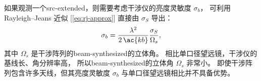 如果观测一个\ac{src-extended}，则需要考虑干涉仪的亮度灵敏度 $\sigma_b$，
可利用 Rayleigh--Jeans 近似 [\autoref{eq:rj-approx}]
直接由 $\sigma_S$ 导出：
\begin{equation}
  \label{eq:sigma-tb}
  \sigma_b = \frac{\lambda^2}{2\,\ac{kb}} \frac{\sigma_S}{\Omega_s} ,
\end{equation}
其中 $\Omega_s$ 是干涉阵列的\ac{beam-synthesized}的立体角。
相比单口径望远镜，干涉仪的基线长、角分辨率高，
所以\ac{beam-synthesized}的立体角 $\Omega_s$ 非常小。
即使干涉阵列包含许多天线，但其亮度灵敏度 $\sigma_b$
与单口径望远镜相比并不具备优势。



